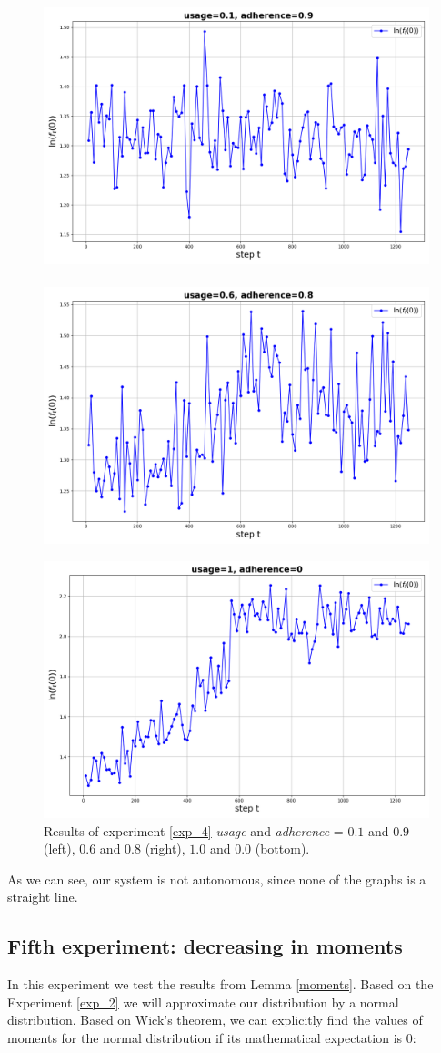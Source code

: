 \documentclass{article}
\begin{document}
        \begin{figure}[h!]
            \centering
            \includegraphics[width=0.49\linewidth]{pictures/semigroup_0.1_0.9.png}~~
            ~~\includegraphics[width=0.49\linewidth]{pictures/semigroup_0.6_0.8.png}
            
            \includegraphics[width=0.49\linewidth]{pictures/semigroup_1_0.png}
            
            \caption{Results of experiment \ref{exp_4} \textit{usage} and \textit{adherence} = $0.1$ and $0.9$ (left), $0.6$ and $0.8$ (right), $1.0$ and $0.0$ (bottom).}
            \label{fig_exp_4}
        \end{figure}

        As we can see, our system is not autonomous, since none of the graphs is a straight line.

\newpage

    \subsection{Fifth experiment: decreasing in moments} \label{exp_5}
        In this experiment we test the results from Lemma \ref{moments}. Based on the Experiment \ref{exp_2} we will approximate our distribution by a normal distribution. Based on Wick's theorem, we can explicitly find the values of moments for the normal distribution if its mathematical expectation is 0:
\end{document}
